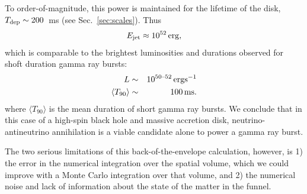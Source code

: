 To order-of-magnitude, this power is maintained for the lifetime of the disk,
$T_{\rm dep}\sim200$~ms (see Sec.~\ref{sec:scales}). Thus
\begin{equation}
  E_{\rm jet} \approx 10^{52} \, {\rm erg} \nonumber,
\end{equation}
which is comparable to the brightest luminosities and durations observed for
shoft duration gamma ray bursts:
\begin{eqnarray}
  L &\sim& 10^{50\text{--}52} \, {\rm erg s^{-1}} \nonumber\\
  \langle T_{90} \rangle &\sim& 100 \,{\rm ms}. \nonumber
\end{eqnarray}
where $\langle T_{90} \rangle$ is the mean duration of short gamma ray bursts.
We conclude that in this case of a high-spin black hole and massive accretion
disk, neutrino-antineutrino annihilation is a viable candidate alone to power a
gamma ray burst.

The two serious limitations of this back-of-the-envelope calculation,
however, is 1) the error in the numerical integration over the spatial volume,
which we could improve with a Monte Carlo integration over that volume,
and 2) the numerical noise and lack of information about the state of the matter
in the funnel.

